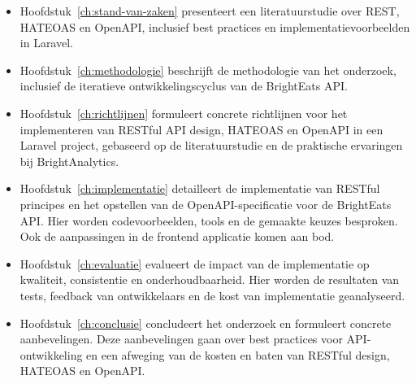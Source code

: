 \begin{itemize}
  \item Hoofdstuk~\ref{ch:stand-van-zaken} presenteert een literatuurstudie over REST, HATEOAS en OpenAPI, inclusief best practices en implementatievoorbeelden in Laravel.
  \item Hoofdstuk~\ref{ch:methodologie} beschrijft de methodologie van het onderzoek, inclusief de iteratieve ontwikkelingscyclus van de BrightEats API.
  \item Hoofdstuk~\ref{ch:richtlijnen} formuleert concrete richtlijnen voor het implementeren van RESTful API design, HATEOAS en OpenAPI in een Laravel project, gebaseerd op de literatuurstudie en de praktische ervaringen bij BrightAnalytics.
  \item Hoofdstuk~\ref{ch:implementatie} detailleert de implementatie van RESTful principes en het opstellen van de OpenAPI-specificatie voor de BrightEats API. Hier worden codevoorbeelden, tools en de gemaakte keuzes besproken. Ook de aanpassingen in de frontend applicatie komen aan bod.
  \item Hoofdstuk~\ref{ch:evaluatie} evalueert de impact van de implementatie op kwaliteit, consistentie en onderhoudbaarheid. Hier worden de resultaten van tests, feedback van ontwikkelaars en de kost van implementatie geanalyseerd.
  \item Hoofdstuk~\ref{ch:conclusie} concludeert het onderzoek en formuleert concrete aanbevelingen. Deze aanbevelingen gaan over best practices voor API-ontwikkeling en een afweging van de kosten en baten van RESTful design, HATEOAS en OpenAPI.
\end{itemize}

